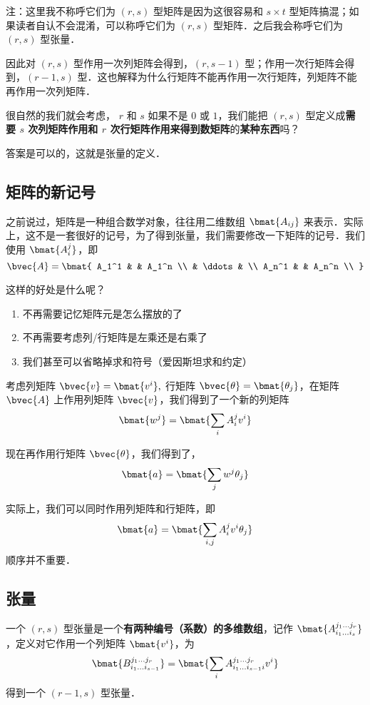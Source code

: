 注：这里我不称呼它们为 $(r, s)$ 型矩阵是因为这很容易和 $s \times t$ 型矩阵搞混；如果读者自认不会混淆，可以称呼它们为 $(r, s)$ 型矩阵．之后我会称呼它们为$(r, s)$ 型张量．

因此对 $(r, s)$ 型作用一次列矩阵会得到，$(r, s - 1)$ 型；作用一次行矩阵会得到，$(r - 1, s)$ 型．这也解释为什么行矩阵不能再作用一次行矩阵，列矩阵不能再作用一次列矩阵．

很自然的我们就会考虑， $r$ 和 $s$ 如果不是 $0$ 或 $1$，我们能把 $(r, s)$ 型定义成\textbf{需要 $s$ 次列矩阵作用和 $r$ 次行矩阵作用来得到数矩阵}的\textbf{某种东西}吗？

答案是可以的，这就是张量的定义．

\subsection{矩阵的新记号}

之前说过，矩阵是一种组合数学对象，往往用二维数组 $\bmat{A_{i j}}$ 来表示．实际上，这不是一套很好的记号，为了得到张量，我们需要修改一下矩阵的记号．我们使用 $\bmat{A_i^j}$，即
$$
\bvec{A} = \bmat{
A_1^1 &  & A_1^n \\
 & \ddots & \\
A_n^1 &  & A_n^n \\
}
$$

这样的好处是什么呢？
\begin{enumerate}
\item 不再需要记忆矩阵元是怎么摆放的了
\item 不再需要考虑列/行矩阵是左乘还是右乘了
\item 我们甚至可以省略掉求和符号（爱因斯坦求和约定）
\end{enumerate}


考虑列矩阵 $\bvec{v} = \bmat{v^i},$ 行矩阵 $\bvec{\theta} = \bmat{\theta_j}$，在矩阵 $\bvec{A}$ 上作用列矩阵 $\bvec{v}$，我们得到了一个新的列矩阵
$$
\bmat{w^j} = \bmat{\sum_i A_i^j v^i}
$$

现在再作用行矩阵 $\bvec{\theta}$，我们得到了，
$$
\bmat{a} = \bmat{\sum_j w^j \theta_j}
$$

实际上，我们可以同时作用列矩阵和行矩阵，即
$$
\bmat{a} = \bmat{\sum_{i, j} A_i^j v^i \theta_j}
$$
顺序并不重要．

\subsection{张量}

一个 $(r,s)$ 型张量是一个\textbf{有两种编号（系数）的多维数组}，记作 $\bmat{A_{i_1 \dots i_s}^{j_1 \dots j_r}}$，定义对它作用一个列矩阵 $\bmat{v^{i}}$，为
\begin{equation}\label{TsrFst_eq1}
\bmat{B_{i_1 \dots i_{s - 1}}^{j_1 \dots j_r}} = \bmat{\sum_{i} A_{i_1 \dots i_{s - 1} i}^{j_1 \dots j_r} v^{i}}
\end{equation}
得到一个 $(r - 1,s)$ 型张量．

